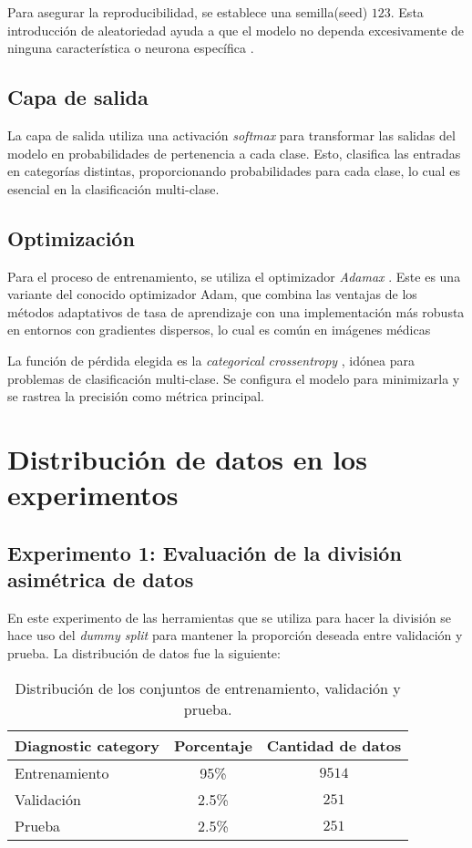   Para asegurar la reproducibilidad, se establece una semilla(seed) $123$. Esta introducción de aleatoriedad ayuda a que el modelo no dependa excesivamente de ninguna característica o neurona específica .
   
   \subsection{Capa de salida}
   
   La capa de salida utiliza una activación \textit{softmax} para transformar las salidas del modelo en probabilidades de pertenencia a cada clase. Esto, clasifica las entradas en categorías distintas, proporcionando probabilidades para cada clase, lo cual es esencial en la clasificación multi-clase.
   
   \subsection{Optimización}
   
   Para el proceso de entrenamiento, se utiliza el optimizador \textit{Adamax} . Este es una variante del conocido optimizador Adam, que combina las ventajas de los métodos adaptativos de tasa de aprendizaje con una implementación más robusta en entornos con gradientes dispersos, lo cual es común en imágenes médicas 
   
   La función de pérdida elegida es la \textit{categorical crossentropy} , idónea para problemas de clasificación multi-clase. Se configura el modelo para minimizarla y se rastrea la precisión como métrica principal.

\section{Distribución de datos en los experimentos}

\subsection{Experimento 1: Evaluación de la división asimétrica de datos}

En este experimento de las herramientas que se utiliza para hacer la división se hace uso del \textit{dummy split}  para mantener la proporción deseada entre validación y prueba. La distribución de datos fue la siguiente:

\begin{table}[ht]
   \centering
   \begin{tabular}{lcc}
   \hline
   \textbf{Diagnostic category} & \textbf{Porcentaje} & \textbf{Cantidad de datos} \\
   \hline
   Entrenamiento       & 95\% & $9514$ \\
   Validación      & 2.5\% & $251$  \\
   Prueba      & 2.5\% & $251$  \\ \hline
   \end{tabular}
   \caption{Distribución de los conjuntos de entrenamiento, validación y prueba.}
   \label{table:data_distribution_e1}
   \end{table}

